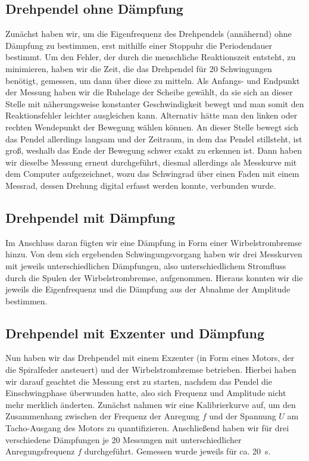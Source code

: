 \documentclass[
	a4paper,
	12pt,
	pagesize,
	ngerman
]{scrartcl}
\begin{document}
	\subsection{Drehpendel ohne Dämpfung}%
	Zunächst haben wir, um die Eigenfrequenz des Drehpendels (annähernd) ohne Dämpfung zu bestimmen, erst mithilfe einer Stoppuhr die Periodendauer bestimmt. Um den Fehler, der durch die menschliche Reaktionszeit entsteht, zu minimieren, haben wir die Zeit, die das Drehpendel für 20 Schwingungen benötigt, gemessen, um dann über diese zu mitteln.
	Als Anfangs- und Endpunkt der Messung haben wir die Ruhelage der Scheibe gewählt, da sie sich an dieser Stelle mit näherungsweise konstanter Geschwindigkeit bewegt und man somit den Reaktionsfehler leichter ausgleichen kann.
	Alternativ hätte man den linken oder rechten Wendepunkt der Bewegung wählen können. An dieser Stelle bewegt sich das Pendel allerdings langsam und der Zeitraum, in dem das Pendel stillsteht, ist groß, weshalb das Ende der Bewegung schwer exakt zu erkennen ist. %
	Dann haben wir dieselbe Messung erneut durchgeführt, diesmal allerdings als Messkurve mit dem Computer aufgezeichnet, wozu das Schwingrad über einen Faden mit einem Messrad, dessen Drehung digital erfasst werden konnte, verbunden wurde. %
	\subsection{Drehpendel mit Dämpfung}
	Im Anschluss daran fügten wir eine Dämpfung in Form einer Wirbelstrombremse hinzu. Von dem sich ergebenden Schwingungsvorgang haben wir drei Messkurven mit jeweils unterschiedlichen Dämpfungen, also unterschiedlichem Stromfluss durch die Spulen der Wirbelstrombremse, aufgenommen. Hieraus konnten wir die jeweils die Eigenfrequenz und die Dämpfung aus der Abnahme der Amplitude bestimmen. %
	\subsection{Drehpendel mit Exzenter und Dämpfung} 
	Nun haben wir das Drehpendel mit einem Exzenter (in Form eines Motors, der die Spiralfeder ansteuert) und der Wirbelstrombremse betrieben. Hierbei haben wir darauf geachtet die Messung erst zu starten, nachdem das Pendel die Einschwingphase überwunden hatte, also sich Frequenz und Amplitude nicht mehr merklich änderten.
	Zunächst nahmen wir eine Kalibrierkurve auf, um den Zusammenhang zwischen der Frequenz der Anregung $ f $ und der Spannung $ U $ am Tacho-Ausgang des Motors zu quantifizieren.
	Anschließend haben wir für drei verschiedene Dämpfungen je 20 Messungen mit unterschiedlicher Anregungsfrequenz $ f $ durchgeführt. Gemessen wurde jeweils für ca. \SI{20}{\second}. 
\end{document}
